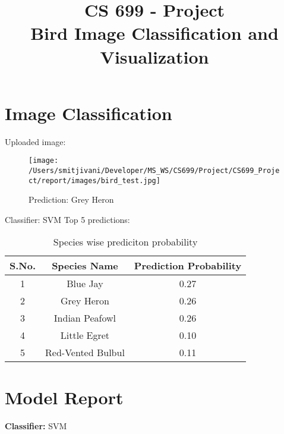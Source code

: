 \documentclass{article}
\date{}
\title{CS 699 - Project\\ Bird Image Classification and Visualization}
\begin{document}
\maketitle

\section{Image Classification}

\noindent Uploaded image:

\begin{figure}[h!]
\centering
\texttt{[image: /Users/smitjivani/Developer/MS\_WS/CS699/Project/CS699\_Project/report/images/bird\_test.jpg]}
\caption*{Prediction: Grey Heron}
\label{fig:method}
\end{figure}

\noindent Classifier: SVM
\newline
\newline
\newline
\noindent Top 5 predictions:
\newline
\begin{table}[h!]
\centering
\begin{tabular}{|c|c|c|} 
\hline
 S.No. & Species Name & Prediction Probability\\ 
\hline
 1 & Blue Jay & 0.27 \\ 
 \hline
 2 & Grey Heron & 0.26 \\  
 \hline
 3 & Indian Peafowl & 0.26 \\    
 \hline
 4 & Little Egret & 0.10 \\    
 \hline
 5 & Red-Vented Bulbul & 0.11 \\    
 \hline
\end{tabular}
\caption{Species wise prediciton probability}
\label{table:data}
\end{table}




\newpage
\section{Model Report}

\textbf{Classifier:} SVM
\newline
\end{document}
